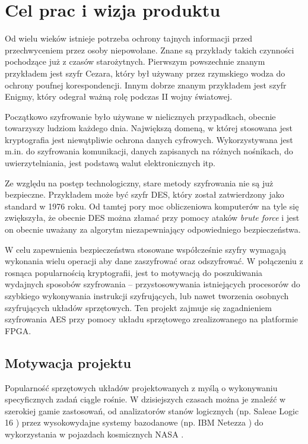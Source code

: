 \section{Cel prac i wizja produktu}
\label{sec:cel-wizja}


Od wielu wieków istnieje potrzeba ochrony tajnych informacji przed przechwyceniem przez osoby niepowołane. Znane są przykłady takich czynności pochodzące już z czasów starożytnych. Pierwszym powszechnie znanym przykładem jest szyfr Cezara, który był używany przez rzymskiego wodza do ochrony poufnej korespondencji. Innym dobrze znanym przykładem jest szyfr Enigmy, który odegrał ważną rolę podczas II wojny światowej.

Początkowo szyfrowanie było używane w nielicznych przypadkach, obecnie towarzyszy ludziom każdego dnia. Największą domeną, w której stosowana jest kryptografia jest niewątpliwie ochrona danych cyfrowych. Wykorzystywana jest m.in. do szyfrowania komunikacji, danych zapisanych na różnych nośnikach, do uwierzytelniania, jest podstawą walut elektronicznych itp.

Ze względu na postęp technologiczny, stare metody szyfrowania nie są już bezpieczne. Przykładem może być szyfr DES, który został zatwierdzony jako standard w 1976 roku. Od tamtej pory moc obliczeniowa komputerów na tyle się zwiększyła, że obecnie DES można złamać przy pomocy ataków \textit{brute force} i jest on obecnie uważany za algorytm niezapewniający odpowiedniego bezpieczeństwa.

W celu zapewnienia bezpieczeństwa stosowane współcześnie szyfry wymagają wykonania wielu operacji aby dane zaszyfrować oraz odszyfrować. W połączeniu z rosnąca popularnością kryptografii, jest to motywacją do poszukiwania wydajnych sposobów szyfrowania -- przystosowywania istniejących procesorów do szybkiego wykonywania instrukcji szyfrujących, lub nawet tworzenia osobnych szyfrujących układów sprzętowych. Ten projekt zajmuje się zagadnieniem szyfrowania AES przy pomocy układu sprzętowego zrealizowanego na platformie FPGA.

\subsection{Motywacja projektu}
Popularność sprzętowych układów projektowanych z myślą o wykonywaniu specyficznych zadań ciągle rośnie. W dzisiejszych czasach można je znaleźć w szerokiej gamie zastosowań, od analizatorów stanów logicznych (np. Saleae Logic 16 \cite{saleae-fpga}) przez wysokowydajne systemy bazodanowe (np. IBM Netezza \cite{netezza-fpga}) do wykorzystania w pojazdach kosmicznych NASA \cite{nasa-fpga}.

